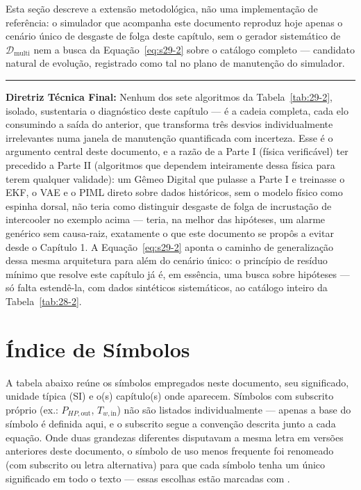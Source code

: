 \documentclass[12pt,a4paper]{article}
\numberwithin{equation}{section}
\numberwithin{table}{section}
\numberwithin{figure}{section}
\begin{document}
{Esta seção descreve a extensão metodológica, não uma implementação de referência: o simulador que acompanha este documento reproduz hoje apenas o cenário único de desgaste de folga deste capítulo, sem o gerador sistemático de $\mathcal{D}_{\text{multi}}$ nem a busca da Equação~\eqref{eq:s29-2} sobre o catálogo completo — candidato natural de evolução, registrado como tal no plano de manutenção do simulador.

\vspace{1em}
\hrule
\vspace{1em}

\textbf{Diretriz Técnica Final:} Nenhum dos sete algoritmos da Tabela~\ref{tab:29-2}, isolado, sustentaria o diagnóstico deste capítulo — é a cadeia completa, cada elo consumindo a saída do anterior, que transforma três desvios individualmente irrelevantes numa janela de manutenção quantificada com incerteza. Esse é o argumento central deste documento, e a razão de a Parte I (física verificável) ter precedido a Parte II (algoritmos que dependem inteiramente dessa física para terem qualquer validade): um Gêmeo Digital que pulasse a Parte I e treinasse o EKF, o VAE e o PIML direto sobre dados históricos, sem o modelo físico como espinha dorsal, não teria como distinguir desgaste de folga de incrustação de intercooler no exemplo acima — teria, na melhor das hipóteses, um alarme genérico sem causa-raiz, exatamente o que este documento se propôs a evitar desde o Capítulo 1. A Equação~\eqref{eq:s29-2} aponta o caminho de generalização dessa mesma arquitetura para além do cenário único: o princípio de resíduo mínimo que resolve este capítulo já é, em essência, uma busca sobre hipóteses — só falta estendê-la, com dados sintéticos sistemáticos, ao catálogo inteiro da Tabela~\ref{tab:28-2}.

\clearpage
\section*{Índice de Símbolos}

A tabela abaixo reúne os símbolos empregados neste documento, seu significado, unidade típica (SI) e o(s) capítulo(s) onde aparecem. Símbolos com subscrito próprio (ex.: $P_{HP,\text{out}}$, $T_{w,\text{in}}$) não são listados individualmente — apenas a base do símbolo é definida aqui, e o subscrito segue a convenção descrita junto a cada equação. Onde duas grandezas diferentes disputavam a mesma letra em versões anteriores deste documento, o símbolo de uso menos frequente foi renomeado (com subscrito ou letra alternativa) para que cada símbolo tenha um único significado em todo o texto — essas escolhas estão marcadas com \dag.

}
\end{document}
